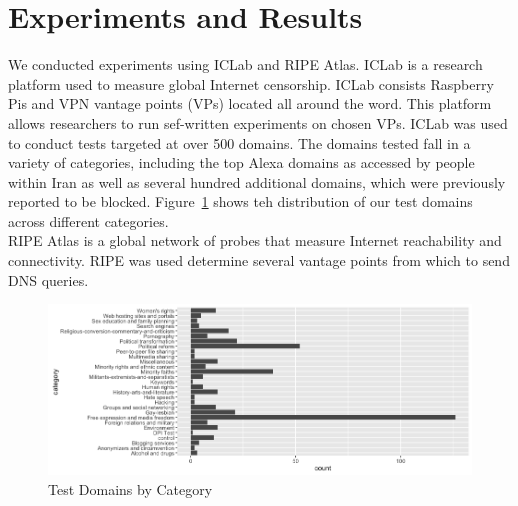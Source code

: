 \section{Experiments and Results}\label{sec:experimentsandresults}
We conducted experiments using ICLab and RIPE Atlas. ICLab is a research platform used to measure global Internet censorship. ICLab consists Raspberry Pis and VPN vantage points (VPs) located all around the word. This  platform allows researchers to run sef-written experiments on chosen VPs. ICLab was used to conduct tests targeted at over 500 domains. The domains tested fall in a variety of categories, including the top  Alexa domains as accessed by people within Iran as well as several hundred additional domains, which were previously reported to be blocked. Figure~\ref{fig:websitelist} shows teh distribution of our test domains across different categories.\\
 RIPE Atlas is a global network of probes that measure Internet reachability and connectivity.  RIPE was used determine several vantage points from which to send DNS queries. 
\begin{figure}
  \centerline{\includegraphics[width=.9\textwidth,keepaspectratio]{pictures/WebsiteList.png}}
  \caption{Test Domains by Category}
  \label{fig:websitelist}
\end{figure}


